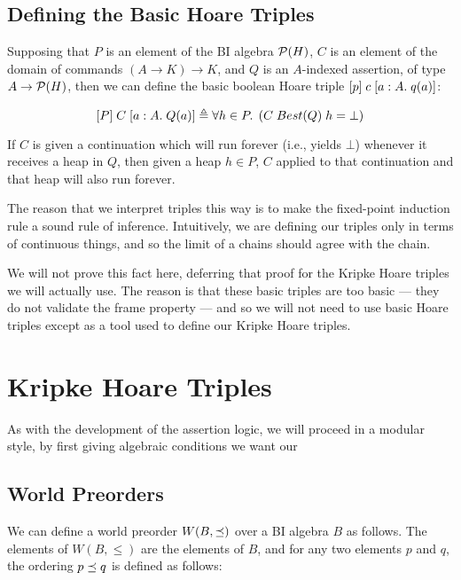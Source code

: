 \subsection{Defining the Basic Hoare Triples}

Supposing that $P$ is an element of the BI algebra $\mathcal{P}(H)$, $C$ is an element
of the domain of commands $(A \to K) \to K$, and $Q$ is an $A$-indexed assertion, of
type $A \to \mathcal{P}(H)$, then we can define the basic boolean Hoare triple 
$[{p}]\;{c}\;[{a:A}.\;{q(a)}]$:

\begin{displaymath}
  [{P}]\;{C}\;[{a:A}.\;{Q(a)}] \triangleq
    \forall h \in P.\; \left(C\;Best(Q)\;h = \bot\right)
\end{displaymath}

If $C$ is given a continuation which will run forever (i.e., yields
$\bot$) whenever it receives a heap in $Q$, then given a heap $h \in
P$, $C$ applied to that continuation and that heap will also run forever.

The reason that we interpret triples this way is to make the
fixed-point induction rule a sound rule of inference. Intuitively, we
are defining our triples only in terms of continuous things, and so
the limit of a chains should agree with the chain.

We will not prove this fact here, deferring that proof for the Kripke
Hoare triples we will actually use. The reason is that these basic
triples are too basic --- they do not validate the frame property ---
and so we will not need to use basic Hoare triples except as a tool
used to define our Kripke Hoare triples.


\section{Kripke Hoare Triples}

As with the development of the assertion logic, we will proceed in a
modular style, by first giving algebraic conditions we want our  

\subsection{World Preorders}

We can define a world preorder $W(B, \preceq)$ over a BI algebra $B$ as
follows.  The elements of $W(B, \leq)$ are the elements of $B$, and for any
two elements $p$ and $q$, the ordering $p \preceq q$ is defined as
follows:

